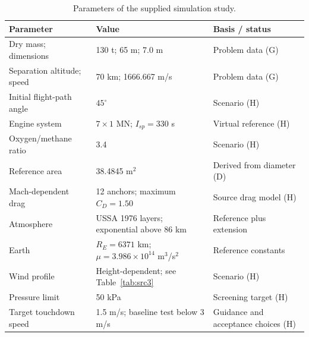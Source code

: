 \begin{table}[htbp]
\caption{Parameters of the supplied simulation study.}
\label{tab:src4}
\small
\setlength{\tabcolsep}{3.5pt}
\begin{tabularx}{\linewidth}{@{}p{.26\linewidth}p{.36\linewidth}X@{}}
\toprule
Parameter & Value & Basis / status \\
\midrule
Dry mass; dimensions & 130 t; 65 m; 7.0 m & Problem data (G) \\
Separation altitude; speed & 70 km; 1666.667 m/s & Problem data (G) \\
Initial flight-path angle & $45^\circ$ & Scenario (H) \\
Engine system & $7\times1$ MN; $I_{sp}=330$ s & Virtual reference (H) \\
Oxygen/methane ratio & 3.4 & Scenario (H) \\
Reference area & 38.4845 m$^2$ & Derived from diameter (D) \\
Mach-dependent drag & 12 anchors; maximum $C_D=1.50$ & Source drag model (H) \\
Atmosphere & USSA 1976 layers; exponential above 86 km & Reference plus extension \\
Earth & $R_E=6371$ km; $\mu=3.986\times10^{14}$ m$^3$/s$^2$ & Reference constants \\
Wind profile & Height-dependent; see Table~\ref{tab:src3} & Scenario (H) \\
Pressure limit & 50 kPa & Screening target (H) \\
Target touchdown speed & 1.5 m/s; baseline test below 3 m/s & Guidance and acceptance choices (H) \\
\bottomrule
\end{tabularx}
\end{table}
